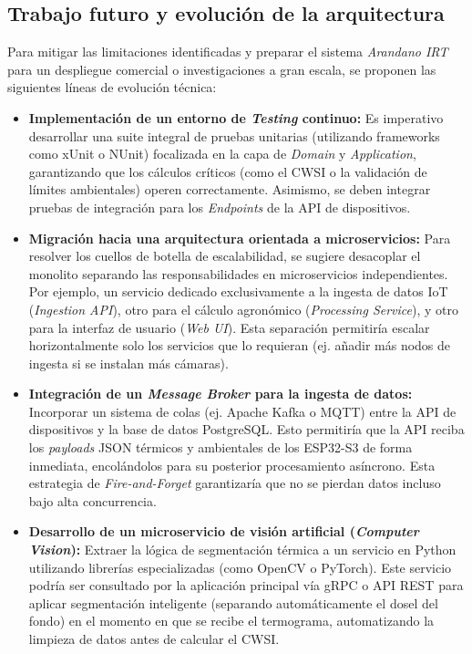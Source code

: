 \subsection{Trabajo futuro y evolución de la arquitectura}
\label{subsec:software_trabajo_futuro}

Para mitigar las limitaciones identificadas y preparar el sistema \textit{Arandano IRT} para un despliegue comercial o investigaciones a gran escala, se proponen las siguientes líneas de evolución técnica:

\begin{itemize}
    \item \textbf{Implementación de un entorno de \textit{Testing} continuo:} Es imperativo desarrollar una suite integral de pruebas unitarias (utilizando frameworks como xUnit o NUnit) focalizada en la capa de \textit{Domain} y \textit{Application}, garantizando que los cálculos críticos (como el CWSI o la validación de límites ambientales) operen correctamente. Asimismo, se deben integrar pruebas de integración para los \textit{Endpoints} de la API de dispositivos.
    
    \item \textbf{Migración hacia una arquitectura orientada a microservicios:} Para resolver los cuellos de botella de escalabilidad, se sugiere desacoplar el monolito separando las responsabilidades en microservicios independientes. Por ejemplo, un servicio dedicado exclusivamente a la ingesta de datos IoT (\textit{Ingestion API}), otro para el cálculo agronómico (\textit{Processing Service}), y otro para la interfaz de usuario (\textit{Web UI}). Esta separación permitiría escalar horizontalmente solo los servicios que lo requieran (ej. añadir más nodos de ingesta si se instalan más cámaras).
    
    \item \textbf{Integración de un \textit{Message Broker} para la ingesta de datos:} Incorporar un sistema de colas (ej. Apache Kafka o MQTT) entre la API de dispositivos y la base de datos PostgreSQL. Esto permitiría que la API reciba los \textit{payloads} JSON térmicos y ambientales de los ESP32-S3 de forma inmediata, encolándolos para su posterior procesamiento asíncrono. Esta estrategia de \textit{Fire-and-Forget} garantizaría que no se pierdan datos incluso bajo alta concurrencia.
    
    \item \textbf{Desarrollo de un microservicio de visión artificial (\textit{Computer Vision}):} Extraer la lógica de segmentación térmica a un servicio en Python utilizando librerías especializadas (como OpenCV o PyTorch). Este servicio podría ser consultado por la aplicación principal vía gRPC o API REST para aplicar segmentación inteligente (separando automáticamente el dosel del fondo) en el momento en que se recibe el termograma, automatizando la limpieza de datos antes de calcular el CWSI.
    

\end{itemize}
